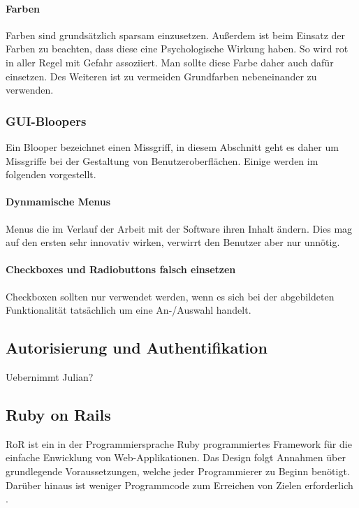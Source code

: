 \paragraph{Farben}

Farben sind grundsätzlich sparsam einzusetzen. Außerdem ist beim Einsatz der
Farben zu beachten, dass diese eine Psychologische Wirkung haben. So wird rot in
aller Regel mit Gefahr assoziiert. Man sollte diese Farbe daher auch dafür
einsetzen. Des Weiteren ist zu vermeiden Grundfarben nebeneinander zu verwenden.

\subsubsection{GUI-Bloopers}

Ein Blooper bezeichnet einen Missgriff, in diesem Abschnitt geht es daher um
Missgriffe bei der Gestaltung von Benutzeroberflächen. Einige werden im
folgenden vorgestellt.

\paragraph{Dynmamische Menus}

Menus die im Verlauf der Arbeit mit der Software ihren Inhalt ändern. Dies mag
auf den ersten sehr innovativ wirken, verwirrt den Benutzer aber nur unnötig.

\paragraph{Checkboxes und Radiobuttons falsch einsetzen}

Checkboxen sollten nur verwendet werden, wenn es sich bei der abgebildeten
Funktionalität tatsächlich um eine An-/Auswahl handelt.

\subsection{Autorisierung und Authentifikation}
\begin{k}
Uebernimmt Julian?
\end{k}

\subsection{Ruby on Rails}
\ac{RoR} ist ein in der Programmiersprache Ruby programmiertes Framework für die
einfache Enwicklung von Web-Applikationen. Das Design folgt Annahmen über
grundlegende Voraussetzungen, welche jeder Programmierer zu Beginn benötigt.
Darüber hinaus ist weniger Programmcode zum Erreichen von Zielen
erforderlich \cite{railsGuides:2013}.

